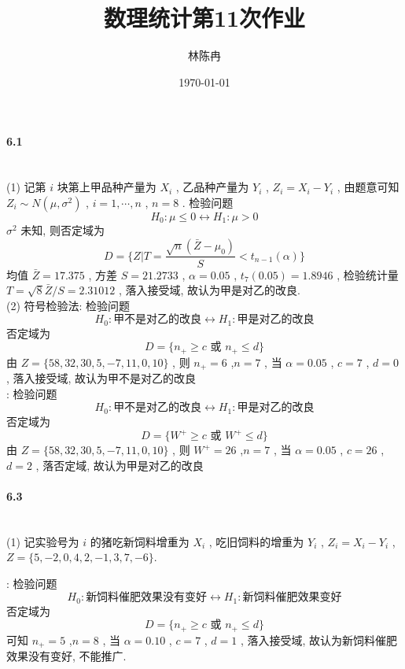 \documentclass[a4paper, UTF8]{ctexart}				%
\title{数理统计第11次作业}
\author{林陈冉}
\date{\today}
\numberwithin{equation}{section}				%
\begin{document}
    \maketitle
    \paragraph{6.1}\quad\\
        \noindent(1) 记第 $i$ 块第上甲品种产量为 $X_i$ , 乙品种产量为 $Y_i$ , $Z_i=X_i-Y_i$ , 由题意可知 $Z_i\sim N(\mu, \sigma^2)$ , $i=1, \cdots, n$ , $n=8$ . 检验问题
        \[H_0:\mu \le 0 \leftrightarrow H_1:\mu > 0\]
        $\sigma^2$ 未知, 则否定域为 
        \[D=\{Z|T=\frac{\sqrt{n}(\bar{Z}-\mu_0)}{S}<t_{n-1}(\alpha)\}\]
        均值 $\bar{Z}=17.375$ , 方差 $S=21.2733$ , $\alpha=0.05$ , $t_{7}(0.05)=1.8946$ , 检验统计量 $T=\sqrt{8}\bar{Z}/S=2.31012$ ,
        落入接受域, 故认为甲是对乙的改良.\\

        \noindent(2) 符号检验法: 检验问题
        \[H_0 : \text{甲不是对乙的改良} \leftrightarrow H_1 : \text{甲是对乙的改良}\]
        否定域为
        \[D=\{n_+ \ge c \text{ 或 } n_+ \le d\}\]
        由 $Z = \{58, 32, 30, 5, -7, 11, 0, 10\}$ , 则 $n_+ = 6$ ,$n = 7$ , 当 $\alpha = 0.05$ , $c = 7$ , $d = 0$ ,
        落入接受域, 故认为甲不是对乙的改良\\

        : 检验问题
        \[H_0 : \text{甲不是对乙的改良} \leftrightarrow H_1 : \text{甲是对乙的改良}\]
        否定域为
        \[D=\{W^+ \ge c \text{ 或 } W^+ \le d\}\]
        由 $Z = \{58, 32, 30, 5, -7, 11, 0, 10\}$ , 则 $W^+ = 26$ ,$n = 7$ , 当 $\alpha = 0.05$ , $c = 26$ , $d = 2$ ,
        落否定域, 故认为甲是对乙的改良\\
     
    \paragraph{6.3}\quad\\
        \noindent(1) 记实验号为 $i$ 的猪吃新饲料增重为 $X_i$ , 吃旧饲料的增重为 $Y_i$ , $Z_i=X_i-Y_i$ , $Z=\{5,-2,0,4,2,-1,3,7,-6\}$.

        : 检验问题
        \[H_0 : \text{新饲料催肥效果没有变好} \leftrightarrow H_1 : \text{新饲料催肥效果变好}\]
        否定域为
        \[D=\{n_+ \ge c \text{ 或 } n_+ \le d\}\]
        可知 $n_+ = 5$ ,$n = 8$ , 当 $\alpha = 0.10$ , $c = 7$ , $d = 1$ ,
        落入接受域, 故认为新饲料催肥效果没有变好, 不能推广.\\
\end{document}
